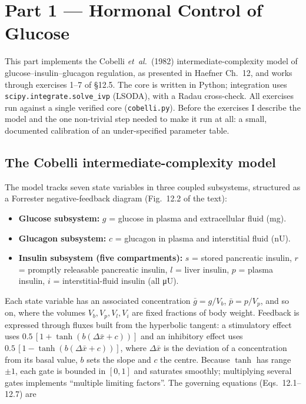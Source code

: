 \section{Part 1 --- Hormonal Control of Glucose}

This part implements the Cobelli \emph{et~al.}\ (1982) intermediate-complexity model of
glucose--insulin--glucagon regulation, as presented in Haefner Ch.~12, and works through
exercises 1--7 of \S12.5. The core is written in Python; integration uses
\texttt{scipy.integrate.solve\_ivp} (LSODA), with a Radau cross-check. All exercises run against a
single verified core (\texttt{cobelli.py}). Before the exercises I describe the model and the one
non-trivial step needed to make it run at all: a small, documented calibration of an under-specified
parameter table.

\subsection{The Cobelli intermediate-complexity model}

The model tracks seven state variables in three coupled subsystems, structured as a Forrester
negative-feedback diagram (Fig.~12.2 of the text):

\begin{itemize}[leftmargin=1.4em,itemsep=1pt]
\item \textbf{Glucose subsystem:} $g$ = glucose in plasma and extracellular fluid (mg).
\item \textbf{Glucagon subsystem:} $c$ = glucagon in plasma and interstitial fluid (nU).
\item \textbf{Insulin subsystem (five compartments):} $s$ = stored pancreatic insulin, $r$ =
promptly releasable pancreatic insulin, $l$ = liver insulin, $p$ = plasma insulin, $i$ =
interstitial-fluid insulin (all \si{\micro U}).
\end{itemize}

Each state variable has an associated concentration $\bar{g}=g/V_b$, $\bar{p}=p/V_p$, and so on,
where the volumes $V_b,V_p,V_l,V_i$ are fixed fractions of body weight. Feedback is expressed through
fluxes built from the hyperbolic tangent: a stimulatory effect uses
$0.5\,[1+\tanh(b(\Delta\bar{x}+c))]$ and an inhibitory effect uses $0.5\,[1-\tanh(b(\Delta\bar{x}+c))]$,
where $\Delta\bar{x}$ is the deviation of a concentration from its basal value, $b$ sets the slope and
$c$ the centre. Because $\tanh$ has range $\pm1$, each gate is bounded in $[0,1]$ and saturates
smoothly; multiplying several gates implements ``multiple limiting factors''. The governing equations
(Eqs.~12.1--12.7) are

